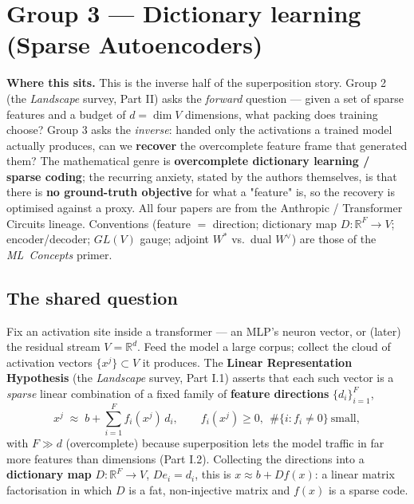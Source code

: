 


\section*{Group 3 --- Dictionary learning (Sparse Autoencoders)}

\begin{callout}
\textbf{Where this sits.} This is the inverse half of the superposition story. Group 2 (the \emph{Landscape} survey, Part II) asks the \emph{forward} question --- given a set of sparse features and a budget of $d=\dim V$ dimensions, what packing does training choose? Group 3 asks the \emph{inverse}: handed only the activations a trained model actually produces, can we \textbf{recover} the overcomplete feature frame that generated them? The mathematical genre is \textbf{overcomplete dictionary learning / sparse coding}; the recurring anxiety, stated by the authors themselves, is that there is \textbf{no ground-truth objective} for what a "feature" is, so the recovery is optimised against a proxy. All four papers are from the Anthropic / Transformer Circuits lineage. Conventions (feature $=$ direction; dictionary map $D:\mathbb{R}^F\to V$; encoder/decoder; $GL(V)$ gauge; adjoint $W^{*}$ vs.\ dual $W^{\vee}$) are those of the \emph{ML~Concepts} primer.
\end{callout}

\subsection*{The shared question}

Fix an activation site inside a transformer --- an MLP's neuron vector, or (later) the residual stream $V=\mathbb{R}^{d}$. Feed the model a large corpus; collect the cloud of activation vectors $\{x^{j}\}\subset V$ it produces. The \textbf{Linear Representation Hypothesis} (the \emph{Landscape} survey, Part I.1) asserts that each such vector is a \emph{sparse} linear combination of a fixed family of \textbf{feature directions} $\{d_i\}_{i=1}^{F}$,
\[
x^{j}\;\approx\;b+\sum_{i=1}^{F} f_i(x^{j})\,d_i,\qquad f_i(x^{j})\ge 0,\ \ \#\{i:f_i\neq 0\}\ \text{small},
\]
with $F\gg d$ (overcomplete) because superposition lets the model traffic in far more features than dimensions (Part I.2). Collecting the directions into a \textbf{dictionary map} $D:\mathbb{R}^{F}\to V$, $D e_i=d_i$, this is $x\approx b+Df(x)$: a linear matrix factorisation in which $D$ is a fat, non-injective matrix and $f(x)$ is a sparse code.

